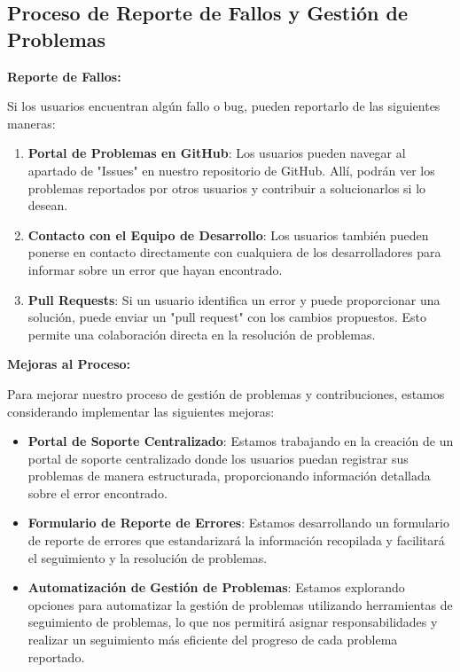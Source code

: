 \documentclass{article}
\begin{document}
\subsection{Proceso de Reporte de Fallos y Gestión de Problemas}

\textbf{Reporte de Fallos:}

Si los usuarios encuentran algún fallo o bug, pueden reportarlo de las siguientes maneras:

\begin{enumerate}
    \item \textbf{Portal de Problemas en GitHub}: Los usuarios pueden navegar al apartado de "Issues" en nuestro repositorio de GitHub. Allí, podrán ver los problemas reportados por otros usuarios y contribuir a solucionarlos si lo desean.
    
    \item \textbf{Contacto con el Equipo de Desarrollo}: Los usuarios también pueden ponerse en contacto directamente con cualquiera de los desarrolladores para informar sobre un error que hayan encontrado.
    
    \item \textbf{Pull Requests}: Si un usuario identifica un error y puede proporcionar una solución, puede enviar un "pull request" con los cambios propuestos. Esto permite una colaboración directa en la resolución de problemas.
\end{enumerate}

\textbf{Mejoras al Proceso:}

Para mejorar nuestro proceso de gestión de problemas y contribuciones, estamos considerando implementar las siguientes mejoras:

\begin{itemize}
    \item \textbf{Portal de Soporte Centralizado}: Estamos trabajando en la creación de un portal de soporte centralizado donde los usuarios puedan registrar sus problemas de manera estructurada, proporcionando información detallada sobre el error encontrado.
    
    \item \textbf{Formulario de Reporte de Errores}: Estamos desarrollando un formulario de reporte de errores que estandarizará la información recopilada y facilitará el seguimiento y la resolución de problemas.
    
    \item \textbf{Automatización de Gestión de Problemas}: Estamos explorando opciones para automatizar la gestión de problemas utilizando herramientas de seguimiento de problemas, lo que nos permitirá asignar responsabilidades y realizar un seguimiento más eficiente del progreso de cada problema reportado.
\end{itemize}
\end{document}
